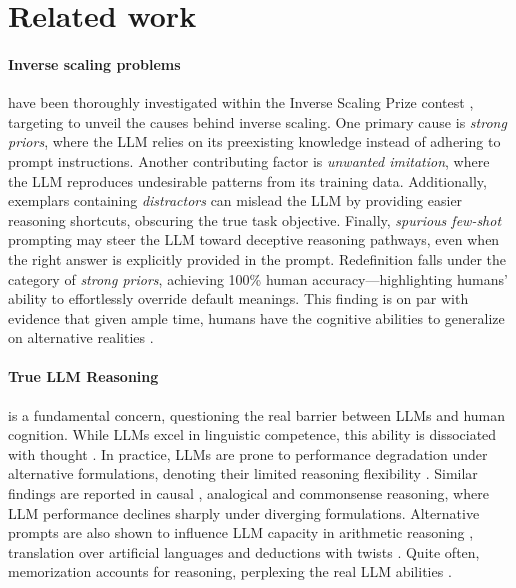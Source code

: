 \section{Related work}
\paragraph{Inverse scaling problems} have been thoroughly investigated within the Inverse Scaling Prize contest \cite{mckenzie2024inversescalingbiggerisnt}, targeting to unveil the causes behind inverse scaling. One primary cause is \textit{strong priors}, where the LLM relies on its preexisting knowledge instead of adhering to prompt instructions. Another contributing factor is \textit{unwanted imitation}, where the LLM reproduces undesirable patterns from its training data. Additionally, exemplars containing \textit{distractors} can mislead the LLM by providing easier reasoning shortcuts, obscuring the true task objective. Finally, \textit{spurious few-shot} prompting may steer the LLM toward deceptive reasoning pathways, even when the right answer is explicitly provided in the prompt. Redefinition falls under the category of \textit{strong priors}, achieving 100\% human accuracy—highlighting humans' ability to effortlessly override default meanings. This finding is on par with evidence that given ample time, humans have the cognitive abilities to generalize on alternative realities \cite{wu-etal-2024-reasoning}.
\paragraph{True LLM Reasoning} is a fundamental concern, questioning the real barrier between LLMs and human cognition.  While LLMs excel in linguistic competence, this ability is dissociated with thought \cite{Mahowald2024DissociatingLA}.
In practice, LLMs are prone to performance degradation under alternative formulations, denoting their limited reasoning flexibility \cite{wu-etal-2024-reasoning}. Similar findings are reported in causal  \cite{jin2024largelanguagemodelsinfer, Gendron2024CanLL}, analogical \cite{Lewis2024UsingCT, Stevenson2024CanLL} and commonsense \cite{Nezhurina2024AliceIW} reasoning, where LLM performance declines sharply under diverging formulations. Alternative prompts are also shown to influence LLM capacity in arithmetic reasoning \cite{Ball2024CanWC, li-etal-2024-challenging}, translation over artificial languages and deductions with twists \cite{li-etal-2024-challenging}. Quite often, memorization accounts for reasoning, perplexing the real LLM abilities \cite{xie2024memorizationlargelanguagemodels, lou2024quantifyingincontextreasoningeffects, wang2024generalizationvsmemorizationtracing}.